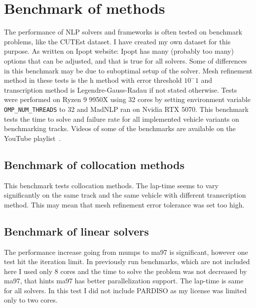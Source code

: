 \chapter{Benchmark of methods}
The performance of NLP solvers and frameworks is often tested on benchmark problems, like the CUTEst \cite{gouldCUTEstConstrainedUnconstrained2014} dataset. I have created my own dataset for this purpose.
As written on Ipopt website: Ipopt has many (probably too many) options \cite{ipopt_options} that can be adjusted, and that is true for all solvers. Some of differences in this benchmark may be due to suboptimal setup of the solver. Mesh refinement method in these tests is the h method with error threshold $10^-1$ and transcription method is Legendre-Gauss-Radau if not stated otherwise. Tests were performed on Ryzen 9 9950X using 32 cores by setting environment variable \texttt{OMP\_NUM\_THREADS} to 32 and MadNLP ran on Nvidia RTX 5070. This benchmark tests the time to solve and failure rate for all implemented vehicle variants on benchmarking tracks. Videos of some of the benchmarks are available on the YouTube playlist~\cite{slapsim_benchmark_playlist}.
\label{sec:benchmark}

\section{Benchmark of collocation methods}
This benchmark tests collocation methods. The lap-time seems to vary significantly on the same track and the same vehicle with different transcription method. This may mean that mesh refinement error tolerance was set too high.

\label{tab:benchmark-summary}

\label{tab:benchmark-results}

\section{Benchmark of linear solvers}
The performance increase going from mumps to ma97 is significant, however one test hit the iteration limit. In previously run benchmarks, which are not included here I used only 8 cores and the time to solve the problem was not decreased by ma97, that hints ma97 has better parallelization support.  The lap-time is same for all solvers. In this test I did not include PARDISO as my license was limited only to two cores. 

\label{tab:linsolver-summary}

\label{tab:linsolver-results}

